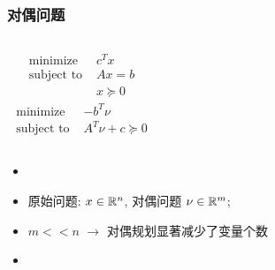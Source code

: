 \documentclass[handout,10pt]{beamer}
\begin{document}
\begin{frame}
   \frametitle{对偶问题}

    \begin{example}[标准形式LP及其对偶 ]
    \begin{columns}
	    \begin{equation}
	    \begin{array}{ll}
	    \text { minimize } & c^{T} x \\
	    \text { subject to } & A x=b \\
	    & x \succeq 0
	    \end{array}
	    \end{equation}
	    \begin{equation}
	    \begin{array}{ll}
	    \text { minimize } & -b^{T} \nu \\
	    \text { subject to } & A^{T} \nu + c \succeq 0
	    \end{array}
	    \end{equation}	
	\end{columns}
    \end{example}

 \begin{itemize}[<+->]
   \item {}
\item 原始问题: $x \in \mathbb{R}^n$, 对偶问题 $\nu \in \mathbb{R}^m$;
\item   $m<<n$ $\rightarrow$ 对偶规划显著减少了变量个数 
\item {}

 \end{itemize}

\end{frame}

\end{document}
